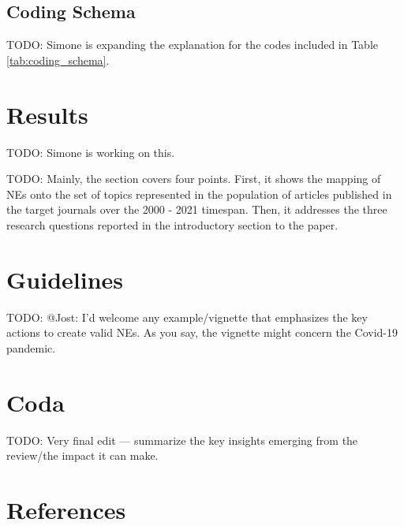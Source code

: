 \documentclass[nobib]{tufte-handout}
\newcommand{\todo}[1]{}
\renewcommand{\todo}[1]{{\color{RedOrange} TODO: {#1}}}
\begin{document}
\begin{refsection}
\subsection{Coding Schema}
\label{subsec:coding_schema}


\todo{Simone is expanding the explanation for the codes included in Table \ref{tab:coding_schema}.}

\section{Results}
\label{sec:results}

\todo{Simone is working on this.}

\todo{Mainly, the section covers four points. First, it shows the mapping of NEs onto 
the set of topics represented in the population of articles published in the
target journals over the 2000 - 2021 timespan. Then, it addresses
the three research questions reported in the introductory section to the 
paper.}

\section{Guidelines}
\label{sec:guidelines}



\todo{@Jost: I'd welcome any example/vignette that emphasizes the key actions to create 
valid NEs. As you say, the vignette might concern the Covid-19 pandemic.}

\section{Coda}
\label{sec:coda}

\todo{Very final edit --- summarize the key insights emerging from the review/the impact
it can make.}

%
\section{References}
\printbibliography[heading=none]
\end{refsection}
\end{document}
